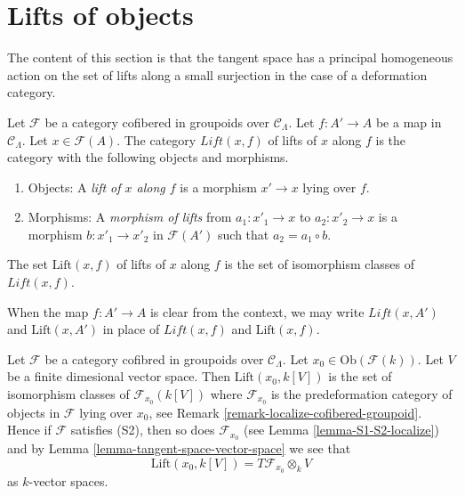 \section{Lifts of objects}
\label{section-lifts}

\noindent
The content of this section is that the tangent space has a principal
homogeneous action on the set of lifts along a small surjection
in the case of a deformation category.

\begin{definition}
\label{definition-lifts}
Let $\mathcal{F}$ be a category cofibered in groupoids over
$\mathcal{C}_\Lambda$. Let $f: A' \to A$ be a map in $\mathcal{C}_\Lambda$.
Let $x \in \mathcal{F}(A)$. The category $\textit{Lift}(x,f)$ of lifts of $x$
along $f$ is the category with the following objects and 
morphisms. 
\begin{enumerate}
\item Objects: A {\it lift of $x$ along $f$} is a morphism $x' \to x$ 
lying over $f$.
\item Morphisms: A {\it morphism of lifts} from $a_1 : x'_1 \to x$ to
$a_2 : x'_2 \to x$ is a morphism $b : x'_1 \to x'_2$ in 
$\mathcal{F}(A')$ such that $a_2 = a_1 \circ b$.
\end{enumerate}
The set $\text{Lift}(x,f)$ of lifts of $x$ along $f$ is the set of 
isomorphism classes of $\textit{Lift}(x,f)$.
\end{definition}

\begin{remark}
\label{remark-omit-arrow}
When the map $f: A' \to A$ is clear from the context, we may write 
$\textit{Lift}(x,A')$ and $\text{Lift}(x,A')$ in place of 
$\textit{Lift}(x,f)$ and $\text{Lift}(x,f)$. 
\end{remark}

\begin{remark}
\label{remark-tangent-space-lifting}
Let $\mathcal{F}$ be a category cofibred in groupoids over
$\mathcal{C}_\Lambda$. Let $x_0 \in \text{Ob}(\mathcal{F}(k))$.
Let $V$ be a finite dimesional vector space.
Then $\text{Lift}(x_0, k[V])$ is the set of isomorphism classes
of $\mathcal{F}_{x_0}(k[V])$ where $\mathcal{F}_{x_0}$ is the
predeformation category of objects in $\mathcal{F}$ lying over
$x_0$, see
Remark \ref{remark-localize-cofibered-groupoid}.
Hence if $\mathcal{F}$ satisfies (S2), then so does
$\mathcal{F}_{x_0}$ (see
Lemma \ref{lemma-S1-S2-localize})
and by
Lemma \ref{lemma-tangent-space-vector-space}
we see that
$$
\text{Lift}(x_0, k[V]) = T\mathcal{F}_{x_0} \otimes_k V
$$
as $k$-vector spaces.
\end{remark}

